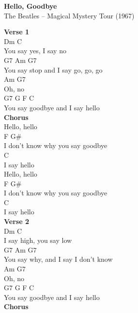 \documentclass[a4paper]{article}
\begin{document}
    \begin{center}
        \textbf{Hello, Goodbye}
        ~\\
        The Beatles -- Magical Mystery Tour (1967)
    \end{center}
    {
        \scriptsize
        \textbf{Verse 1}
        ~\\
        {
            \cutive
            \obeyspaces
Dm           C
\\
You say yes, I say no 
\\
G7               Am            G7
\\
You say stop and I say go, go, go 
\\
Am  G7
\\
Oh, no 
\\
G7           G      F        C
\\
You say goodbye and I say hello 
\\

        }
        \textbf{Chorus}
        ~\\
        {
            \cutive
            \obeyspaces
Hello, hello
\\
             F               G\#
\\
I don't know why you say goodbye 
\\
         C
\\
I say hello 
\\
Hello, hello
\\
             F               G\#
\\
I don't know why you say goodbye 
\\
         C
\\
I say hello 
\\

        }
        \textbf{Verse 2}
        ~\\
        {
            \cutive
            \obeyspaces
Dm          C
\\
I say high, you say low 
\\
G7               Am            G7
\\
You say why, and I say I don't know 
\\
Am  G7
\\
Oh, no 
\\
G7           G      F        C
\\
You say goodbye and I say hello 
\\

        }
        \textbf{Chorus}
        ~\\
        {
            \cutive
            \obeyspaces

}}
\end{document}
